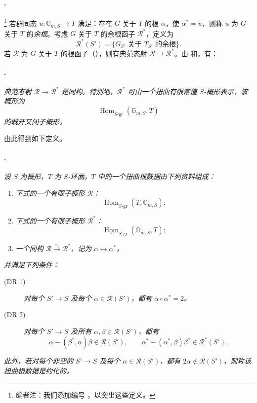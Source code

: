 \paragraph{.}
\footnote{编者注：我们添加编号 ，以突出这些定义。}
若群同态 \(u:\mathbb G_{m,S}\to T\) 满足：存在 \(G\) 关于 \(T\) 的根 \(\alpha\)，使 \(\alpha^*=u\)，则称 \(u\) 为 \(G\) 关于 \(T\) 的\emph{余根}。考虑 \(G\) 关于 \(T\) 的余根函子 \(\mathcal R^*\)，定义为
\[
  \mathcal R^*(S')
  =
  \{\text{\(G_{S'}\) 关于 \(T_{S'}\) 的余根}\}.
\]
若 \(\mathcal R\) 为 \(G\) 关于 \(T\) 的根函子（），则有典范态射 \(\mathcal R\to\mathcal R^*\)。由  和，有：

\paragraph{.}
\textit{典范态射 \(\mathcal R\to\mathcal R^*\) 是同构。特别地，\(\mathcal R^*\) 可由一个扭曲有限常值 \(S\)-概形表示，该概形为}
\[
  \underline{\operatorname{Hom}}_{S\text{-gr}}
    (\mathbb G_{m,S},T)
\]
\textit{的既开又闭子概形。}

由此得到如下定义。

\paragraph{.}
\textit{设 \(S\) 为概形，\(T\) 为 \(S\)-环面。\(T\) 中的一个\emph{扭曲根数据}由下列资料组成：}
\begin{enumerate}
\item[(i)] \textit{下式的一个有限子概形 \(\mathcal R\)：}
  \[
    \underline{\operatorname{Hom}}_{S\text{-gr}}
      (T,\mathbb G_{m,S});
  \]
\item[(ii)] \textit{下式的一个有限子概形 \(\mathcal R^*\)：}
  \[
    \underline{\operatorname{Hom}}_{S\text{-gr}}
      (\mathbb G_{m,S},T);
  \]
\item[\SGAInlineRefTarget{sga3:xxii:def:1.9:item:iii}(iii)] \textit{一个同构
  \(\mathcal R\xrightarrow{\sim}\mathcal R^*\)，记为 \(\alpha\mapsto\alpha^*\)，}
\end{enumerate}
\textit{并满足下列条件：}
\begin{description}
\item[\textup{(DR 1)}]
  \textit{对每个 \(S'\to S\) 及每个 \(\alpha\in\mathcal R(S')\)，都有 \(\alpha\circ\alpha^*=2\)。}
\item[\textup{(DR 2)}]
  \textit{对每个 \(S'\to S\) 及所有 \(\alpha,\beta\in\mathcal R(S')\)，都有}
  \[
    \alpha-(\beta^*,\alpha)\beta\in\mathcal R(S'),
    \qquad
    \alpha^*-(\alpha^*,\beta)\beta^*\in\mathcal R^*(S').
  \]
\end{description}
\textit{此外，若对每个非空的 \(S'\to S\) 及每个 \(\alpha\in\mathcal R(S')\)，都有 \(2\alpha\notin\mathcal R(S')\)，则称该扭曲根数据是\emph{约化的}。}

